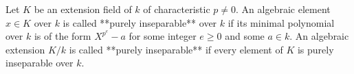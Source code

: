 Let $K$ be an extension field of $k$ of characteristic $p \neq 0$. An algebraic element $x \in K$ over $k$ is called **purely inseparable** over $k$ if its minimal polynomial over $k$ is of the form $X^{p^e} - a$ for some integer $e \geq 0$ and some $a \in k$. An algebraic extension $K/k$ is called **purely inseparable** if every element of $K$ is purely inseparable over $k$.
